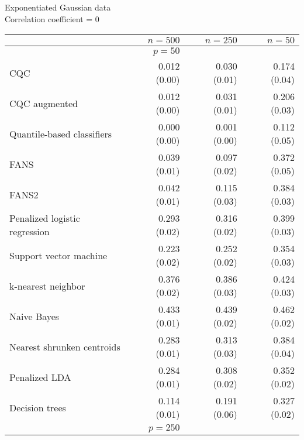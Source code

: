 \begin{table}[p]
  \centering
  Exponentiated Gaussian data \\
  Correlation coefficient = 0 \\[2ex]
  \begin{adjustbox}{max size={\textwidth}{10cm}}
    \begin{tabular}{l@{\extracolsep{15mm}}rrr}
      
      \hline
      & $n=500$ & $n=250$ & $n=50$ \\ 
      \hline
      & $p = 50$ \\
      \hline

      CQC & 0.012 (0.00) & 0.030 (0.01) & 0.174 (0.04) \\ 
      CQC augmented & 0.012 (0.00) & 0.031 (0.01) & 0.206 (0.03) \\ 
      Quantile-based classifiers & 0.000 (0.00) & 0.001 (0.00) & 0.112 (0.05) \\ 
      FANS  & 0.039 (0.01) & 0.097 (0.02) & 0.372 (0.05) \\
      FANS2 & 0.042 (0.01) & 0.115 (0.03) & 0.384 (0.03) \\
      Penalized logistic regression & 0.293 (0.02) & 0.316 (0.02) & 0.399 (0.03) \\ 
      Support vector machine & 0.223 (0.02) & 0.252 (0.02) & 0.354 (0.03) \\ 
      k-nearest neighbor & 0.376 (0.02) & 0.386 (0.03) & 0.424 (0.03) \\ 
      Naive Bayes & 0.433 (0.01) & 0.439 (0.02) & 0.462 (0.02) \\ 
      Nearest shrunken centroids & 0.283 (0.01) & 0.313 (0.03) & 0.384 (0.04) \\ 
      Penalized LDA & 0.284 (0.01) & 0.308 (0.02) & 0.352 (0.02) \\ 
      Decision trees & 0.114 (0.01) & 0.191 (0.06) & 0.327 (0.02) \\ [2ex]

      \hline
      & $p = 250$ \\
      \hline


\end{tabular}
\end{adjustbox}
\end{table}
